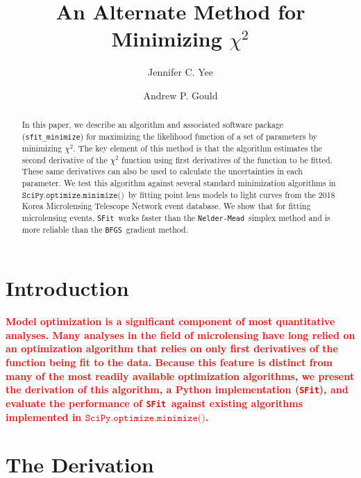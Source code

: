 \documentclass[preprint]{aastex631}
\newcommand{\HL}[1]{\textcolor{red}{\bf#1}}
\newcommand{\minimize}{$\texttt{SciPy.optimize.minimize()}$}
\newcommand{\neldermead}{\texttt{Nelder-Mead}}
\newcommand{\bfgs}{\texttt{BFGS}}
\newcommand{\sfit}{\texttt{SFit}}
\begin{document}
\title{An Alternate Method for Minimizing $\chi^2$}

\author{Jennifer C. Yee}
\author{Andrew P. Gould}

\begin{abstract}
In this paper, we describe an algorithm and associated software package (\texttt{sfit\_minimize}) for maximizing the likelihood function of a set of parameters by minimizing $\chi^2$. The key element of this method is that the algorithm estimates the second derivative of the $\chi^2$ function using first derivatives of the function to be fitted. These same derivatives can also be used to calculate the uncertainties in each parameter. We test this algorithm against several standard minimization algorithms in \minimize\, by fitting point lens models to light curves from the 2018 Korea Microlensing Telescope Network event database. We show that for fitting microlensing events, \sfit\, works faster than the \neldermead\, simplex method and is more reliable than the \bfgs\, gradient method.
\end{abstract}

\section{Introduction}

\HL{Model optimization is a significant component of most quantitative analyses. Many analyses in the field of microlensing have long relied on an optimization algorithm that relies on only first derivatives of the function being fit to the data. Because this feature is distinct from many of the most readily available optimization algorithms, we present the derivation of this algorithm, a Python implementation (\sfit), and evaluate the performance of \sfit\, against existing algorithms implemented in \minimize.}

{\section{The Derivation}
\label{sec:der}}
\end{document}
